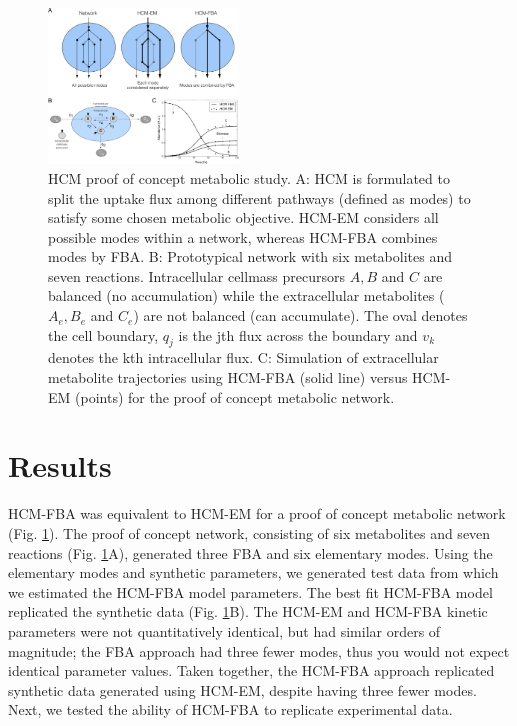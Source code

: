 \documentclass[10pt,twocolumn,twoside,final]{IEEEtran}
\begin{document}

\begin{figure}[!t]\centering
\includegraphics[width=0.45\textwidth]{./figs/Fig-1-Method-General.pdf}
\caption{HCM proof of concept metabolic study.
A: HCM is formulated to split the uptake flux among different pathways (defined as modes) to satisfy some chosen metabolic objective.
HCM-EM considers all possible modes within a network, whereas HCM-FBA combines modes by FBA.
B: Prototypical network with six metabolites and seven reactions.
Intracellular cellmass precursors $A,B$ and $C$ are balanced (no accumulation) while the extracellular metabolites ($A_{e},B_{e}$ and $C_{e}$) are not balanced (can accumulate).
The oval denotes the cell boundary, $q_{j}$ is the jth flux across the boundary and $v_{k}$ denotes the kth intracellular flux.
C: Simulation of extracellular metabolite trajectories using HCM-FBA (solid line) versus HCM-EM (points) for the proof of concept metabolic network.
}\label{fig:model-fitting}
\end{figure}

\section{Results}
HCM-FBA was equivalent to HCM-EM for a proof of concept metabolic network (Fig. \ref{fig:model-fitting}).
The proof of concept network, consisting of six metabolites and seven reactions (Fig. \ref{fig:model-fitting}A), generated three FBA and six elementary modes.
Using the elementary modes and synthetic parameters, we generated test data from which we estimated the HCM-FBA model parameters.
The best fit HCM-FBA model replicated the synthetic data (Fig. \ref {fig:model-fitting}B).
The HCM-EM and HCM-FBA kinetic parameters were not quantitatively identical, but had similar orders of magnitude;
the FBA approach had three fewer modes, thus you would not expect identical parameter values.
Taken together, the HCM-FBA approach replicated synthetic data generated using HCM-EM, despite having three fewer modes.
Next, we tested the ability of HCM-FBA to replicate experimental data.
\end{document}
